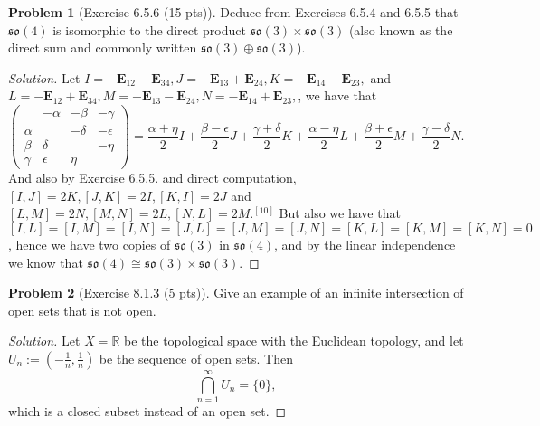 \documentclass{article}
\theoremstyle{definition}
\newtheorem{problem}{Problem}
\theoremstyle{plain}
\begin{document}
\begin{problem}[Exercise 6.5.6 (15 pts)]
Deduce from Exercises 6.5.4 and 6.5.5 that $\mathfrak{so}(4)$ is isomorphic to the direct product $\mathfrak{so}(3)\times\mathfrak{so}(3)$ (also known as the direct sum and commonly written $\mathfrak{so}(3)\oplus\mathfrak{so}(3)$).
\end{problem}
\begin{adjustwidth}{0.7cm}{}
\color{blue}
\begin{proof}[Solution]
Let $I=-\bm{E}_{12}-\bm{E}_{34},J=-\bm{E}_{13}+\bm{E}_{24},K=-\bm{E}_{14}-\bm{E}_{23},$ and $L=-\bm{E}_{12}+\bm{E}_{34},M=-\bm{E}_{13}-\bm{E}_{24},N=-\bm{E}_{14}+\bm{E}_{23},$, we have that
\begin{displaymath}
\begin{pmatrix}&-\alpha&-\beta&-\gamma\\ \alpha&&-\delta&-\epsilon\\ \beta&\delta&&-\eta\\ \gamma&\epsilon&\eta&\end{pmatrix}=\frac{\alpha+\eta}{2}I+\frac{\beta-\epsilon}{2}J+\frac{\gamma+\delta}{2}K+\frac{\alpha-\eta}{2}L+\frac{\beta+\epsilon}{2}M+\frac{\gamma-\delta}{2}N.
\end{displaymath}
And also by Exercise 6.5.5. and direct computation, $[I,J]=2K,[J,K]=2I,[K,I]=2J$ and $[L,M]=2N,[M,N]=2L,[N,L]=2M.^{[10]}$ But also we have that $[I,L]=[I,M]=[I,N]=[J,L]=[J,M]=[J,N]=[K,L]=[K,M]=[K,N]=0$, hence we have two copies of $\mathfrak{so}(3)$ in $\mathfrak{so}(4)$, and by the linear independence we know that $\mathfrak{so}(4)\cong\mathfrak{so}(3)\times\mathfrak{so}(3)$.
\color{black}
\end{proof}
\end{adjustwidth}

\begin{problem}[Exercise 8.1.3 (5 pts)]
Give an example of an infinite intersection of open sets that is not open.
\end{problem}
\begin{adjustwidth}{0.7cm}{}
\color{blue}
\begin{proof}[Solution]
Let $X=\mathbb{R}$ be the topological space with the Euclidean topology, and let $U_n:=(-\frac{1}{n},\frac{1}{n})$ be the sequence of open sets. Then
\begin{displaymath}
\bigcap_{n=1}^\infty U_n=\{0\},
\end{displaymath}
which is a closed subset instead of an open set.
\color{black}
\end{proof}
\end{adjustwidth}
\end{document}
